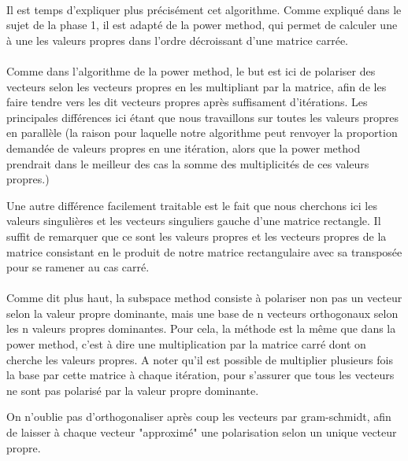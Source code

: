 \documentclass[a4paper,12pt]{article}
\begin{document}
\newpage

    \paragraph{}
    Il est temps d'expliquer plus précisément cet algorithme. Comme
    expliqué dans le sujet de la phase 1, il est adapté de la power
    method, qui permet de calculer une à une les valeurs propres dans
    l'ordre décroissant d'une matrice carrée.

    \paragraph{}
    Comme dans l'algorithme de la power method, le but est ici de
    polariser des vecteurs selon les vecteurs propres en les multipliant
    par la matrice, afin de les faire tendre vers les dit vecteurs propres
    après suffisament d'itérations. Les principales différences ici étant
    que nous travaillons sur toutes les valeurs propres en parallèle (la
    raison pour laquelle notre algorithme peut renvoyer la proportion demandée
    de valeurs propres en une itération, alors que la power method prendrait
    dans le meilleur des cas la somme des multiplicités de ces valeurs propres.)

    Une autre différence facilement traitable est le fait que nous cherchons ici
    les valeurs singulières et les vecteurs singuliers gauche d'une matrice
    rectangle. Il suffit de remarquer que ce sont les valeurs propres et les
    vecteurs propres de la matrice consistant en le produit de notre
    matrice rectangulaire avec sa transposée pour se ramener au cas carré.

    \paragraph{}
    Comme dit plus haut, la subspace method consiste à polariser non pas
    un vecteur selon la valeur propre dominante, mais une base de n vecteurs
    orthogonaux selon les n valeurs propres dominantes. Pour cela, la méthode
    est la même que dans la power method, c'est à dire une multiplication par
    la matrice carré dont on cherche les valeurs propres. A noter qu'il est
    possible de multiplier plusieurs fois la base par cette matrice à chaque
    itération, pour s'assurer que tous les vecteurs ne sont pas polarisé par
    la valeur propre dominante.

    On n'oublie pas d'orthogonaliser après coup les vecteurs par gram-schmidt,
    afin de laisser à chaque vecteur "approximé" une polarisation selon un unique vecteur
    propre.
\end{document}
